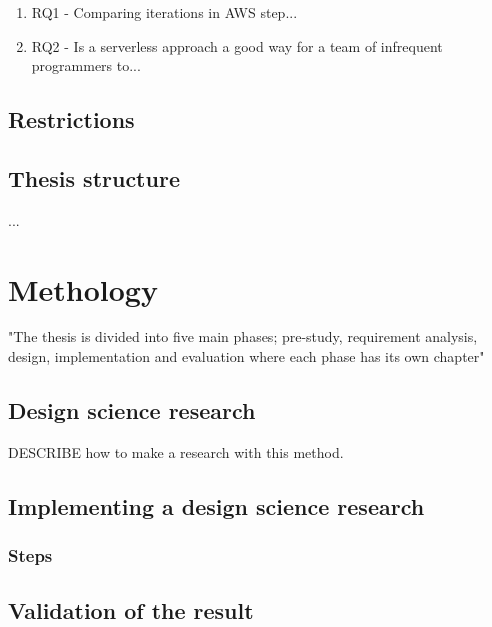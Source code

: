 \documentclass[a4paper,12pt]{article} %
\begin{document}
\begin{enumerate}
\item RQ1 - Comparing iterations in AWS step...
\item RQ2 - Is a serverless approach a good way for a team of infrequent programmers to...
\end{enumerate}

\subsection{Restrictions}


\subsection{Thesis structure}
...


\section{Methology}
"The thesis is divided into five main phases; pre-study, requirement
analysis, design, implementation and evaluation where each phase has its own
chapter" %

\subsection{Design science research}
DESCRIBE how to make a research with this method.

\subsection{Implementing a design science research}

\subsubsection{Steps}

\subsection{Validation of the result}
\end{document}
